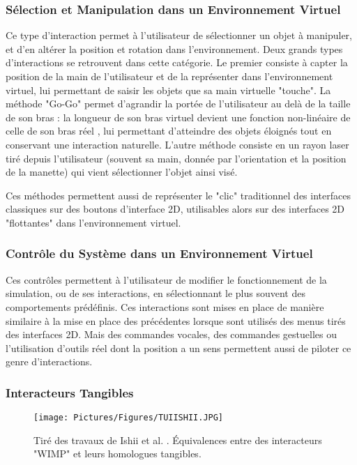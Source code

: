 	\subsubsection{Sélection et Manipulation dans un Environnement Virtuel}
	Ce type d'interaction permet à l'utilisateur de sélectionner un objet à manipuler, et d'en altérer la position et rotation dans l'environnement. Deux grands types d'interactions se retrouvent dans cette catégorie. Le premier consiste à capter la position de la main de l'utilisateur et de la représenter dans l'environnement virtuel, lui permettant de saisir les objets que sa main virtuelle "touche". La méthode "Go-Go" permet d'agrandir la portée de l'utilisateur au delà de la taille de son bras : la longueur de son bras virtuel devient une fonction non-linéaire de celle de son bras réel \cite{poupyrev_go-go_1996}, lui permettant d'atteindre des objets éloignés tout en conservant une interaction naturelle. L'autre méthode consiste en un rayon laser tiré depuis l'utilisateur (souvent sa main, donnée par l'orientation et la position de la manette) qui vient sélectionner l'objet ainsi visé. 
	
	Ces méthodes permettent aussi de représenter le "clic" traditionnel des interfaces classiques sur des boutons d'interface 2D, utilisables alors sur des interfaces 2D "flottantes" dans l'environnement virtuel.
	
	\subsubsection{Contrôle du Système dans un Environnement Virtuel}
	Ces contrôles permettent à l'utilisateur de modifier le fonctionnement de la simulation, ou de ses interactions, en sélectionnant le plus souvent des comportements prédéfinis. Ces interactions sont mises en place de manière similaire à la mise en place des précédentes lorsque sont utilisés des menus tirés des interfaces 2D. Mais des commandes vocales, des commandes gestuelles ou l'utilisation d'outils réel dont la position a un sens permettent aussi de piloter ce genre d'interactions.
	
	
	\subsubsection{Interacteurs Tangibles}
	
		\begin{figure}
			\centering
			\texttt{[image: Pictures/Figures/TUIISHII.JPG]}
			\caption{Tiré des travaux de Ishii et al. \cite{ishii_tangible_1997}. Équivalences entre des interacteurs "WIMP" et leurs homologues tangibles.}
			\label{TUIEx}
		\end{figure}	
	
